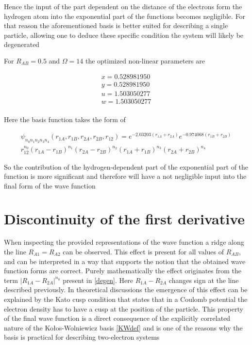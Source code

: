 \documentclass{pracalicmgr}
\begin{document}
Hence the input of the part dependent on the distance of the electrons form the hydrogen atom into the exponential part of the functions becomes negligible. For that reason the aforementioned basis is better suited for describing a single particle, allowing one to deduce these specific condition the system will likely be degenerated

For $R_{AB}=0.5$ and $\Omega=14$ the optimized non-linear parameters are

\begin{align*} 
    x=0.528981950\\
    y=0.528981950\\
    u=1.503050277\\
    w=1.503050277\\
\end{align*}

Here the basis function takes the form of 

\begin{multline}
    \psi_{n_0 n_1 n_2 n_3 n_4} \left( r_{1A}, r_{1B}, r_{2A}, r_{2B}, r_{12} \right) = e^{-2.03203\left(r_{1A}+r_{2A}\right)}e^{-0.974068\left(r_{1B}+r_{2B}\right)}\\
    r_{12}^{n_0}{\left(r_{1A}-r_{1B}\right)}^{n_1}{\left(r_{2A}-r_{2B}\right)}^{n_2}{\left(r_{1A}+r_{1B}\right)}^{n_3}{\left(r_{2A}+r_{2B}\right)}^{n_4}
\end{multline}

So the contribution of the hydrogen-dependent part of the exponential part of the function is more significant and therefore will have a not negligible input into the final form of the wave function    

\section{Discontinuity of the first derivative}

When inspecting the provided representations of the wave function a ridge along the line $R_{A1} = R_{A2}$ can be observed. This effect is present for all values of $R_{AB}$, and can be interpreted in a way that supports the notion that the obtained wave function forms are correct. Purely mathematically the effect originates from the term ${\left| R_{1A} - R_{2A} \right|}^{n_0}$ present in \ref{degen}. Here $R_{1A} - R_{2A}$ changes sign at the line described previously. In theoretical discussions the emergence of this effect can be explained by the Kato cusp condition that states that in a Coulomb potential the electron density has to have a cusp at the position of the particle\cite{Kato2011OnTE}. 
This property of the final wave function is a direct consequence of the explicitly correlated nature of the Kołos-Wolniewicz basis \ref{KWdef} and is one of the reasons why the basis is practical for describing two-electron systems
\end{document}
